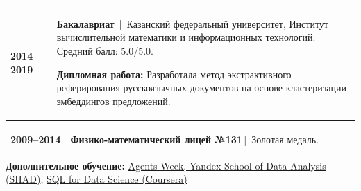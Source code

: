 \documentclass[12pt]{article}
\begin{document}
\vspace{5pt}
\begin{tabularx}{\textwidth}{@{}l >{\RaggedRight\arraybackslash}X@{}}
\textbf{2014--2019} &
\textbf{Бакалавриат} \,|\, Казанский федеральный университет, Институт вычислительной математики и информационных технологий. Средний балл: 5.0/5.0.\par\vspace{3pt}
\textbf{Дипломная работа:} Разработала метод экстрактивного реферирования русскоязычных документов на основе кластеризации эмбеддингов предложений.
\end{tabularx}

\begin{tabularx}{\textwidth}{@{}l >{\RaggedRight\arraybackslash}X@{}}
\textbf{2009--2014} &
\textbf{Физико-математический лицей №131}\,|\, Золотая медаль.
\end{tabularx}

\vspace{6pt}
{\RaggedRight
\textbf{Дополнительное обучение:}
\href{https://education.yandex.ru/profile/docs?id=3bbef619-3937-436f-80f8-69444f154c1c}
{\textcolor{blue!65!black}{Agents Week, Yandex School of Data Analysis (SHAD)}}, \href{https://coursera.org/share/4f64abf86f701eb8df6e2b00cb6e4768}{\textcolor{blue!65!black}{SQL for Data Science (Coursera)}}
\par}
\end{document}
